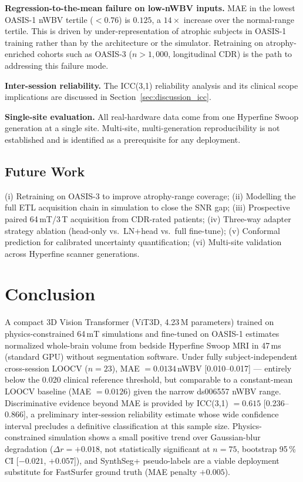 \documentclass[12pt,a4paper]{article}
\begin{document}
\textbf{Regression-to-the-mean failure on low-nWBV inputs.}
MAE in the lowest OASIS-1 nWBV tertile ($< 0.76$) is $0.125$, a
$14\times$ increase over the normal-range tertile. This is driven by
under-representation of atrophic subjects in OASIS-1 training rather
than by the architecture or the simulator. Retraining on
atrophy-enriched cohorts such as OASIS-3 ($n > 1{,}000$, longitudinal
CDR) is the path to addressing this failure mode.

\textbf{Inter-session reliability.}
The ICC(3,1) reliability analysis and its clinical scope implications
are discussed in Section~\ref{sec:discussion_icc}.

\textbf{Single-site evaluation.}
All real-hardware data come from one Hyperfine Swoop generation at a
single site. Multi-site, multi-generation reproducibility is not
established and is identified as a prerequisite for any deployment.

\subsection{Future Work}

(i) Retraining on OASIS-3 to improve atrophy-range coverage;
(ii) Modelling the full ETL acquisition chain in simulation to close the SNR gap;
(iii) Prospective paired 64\,mT/3\,T acquisition from CDR-rated patients;
(iv) Three-way adapter strategy ablation (head-only vs.\ LN+head vs.\ full fine-tune);
(v) Conformal prediction for calibrated uncertainty quantification;
(vi) Multi-site validation across Hyperfine scanner generations.

\section{Conclusion}
\label{sec:conclusion}

A compact 3D Vision Transformer (ViT3D, 4.23\,M parameters) trained on
physics-constrained 64\,mT simulations and fine-tuned on OASIS-1
estimates normalized whole-brain volume from bedside Hyperfine Swoop
MRI in 47\,ms (standard GPU) without segmentation software. Under fully
subject-independent cross-session LOOCV ($n = 23$), MAE
$= 0.0134$\,nWBV [0.010--0.017] --- entirely below the 0.020 clinical
reference threshold, but comparable to a constant-mean LOOCV baseline
(MAE $= 0.0126$) given the narrow ds006557 nWBV range. Discriminative
evidence beyond MAE is provided by ICC(3,1) $= 0.615$ [0.236--0.866], a preliminary inter-session
reliability estimate whose wide confidence interval precludes a
definitive classification at this sample size.
Physics-constrained simulation
shows a small positive trend over Gaussian-blur degradation
($\Delta r = +0.018$, not statistically significant at $n=75$,
bootstrap 95\,\% CI [$-0.021$, $+0.057$]), and SynthSeg+ pseudo-labels are a viable
deployment substitute for FastSurfer ground truth (MAE penalty
$+0.005$).
\end{document}
